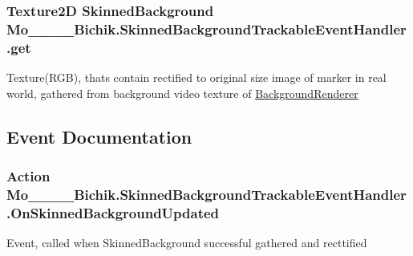 \subsubsection[{get}]{\setlength{\rightskip}{0pt plus 5cm}Texture2\+D Skinned\+Background Mo\+\_\+\_\+\_\+\_\+\+Bichik.\+Skinned\+Background\+Trackable\+Event\+Handler.\+get}\label{class_mo__2015__11__30___bichik_1_1_skinned_background_trackable_event_handler_afa7ab9d224b5062182150daef543e2eb_afa7ab9d224b5062182150daef543e2eb}


Texture(\+R\+G\+B), that\textquotesingle{}s contain rectified to original size image of marker in real world, gathered from background video texture of \hyperlink{class_mo__2015__11__30___bichik_1_1_skinned_background_trackable_event_handler_aff44a53dec36359e8e9550549fbc150a_aff44a53dec36359e8e9550549fbc150a}{Background\+Renderer} 



\subsection{Event Documentation}
\hypertarget{class_mo__2015__11__30___bichik_1_1_skinned_background_trackable_event_handler_a4b3a34147765b3eabbe6e87b82144ee7_a4b3a34147765b3eabbe6e87b82144ee7}{}
\subsubsection[{On\+Skinned\+Background\+Updated}]{\setlength{\rightskip}{0pt plus 5cm}Action Mo\+\_\+\_\+\_\+\_\+\+Bichik.\+Skinned\+Background\+Trackable\+Event\+Handler.\+On\+Skinned\+Background\+Updated}\label{class_mo__2015__11__30___bichik_1_1_skinned_background_trackable_event_handler_a4b3a34147765b3eabbe6e87b82144ee7_a4b3a34147765b3eabbe6e87b82144ee7}


Event, called when Skinned\+Background successful gathered and recttified 

